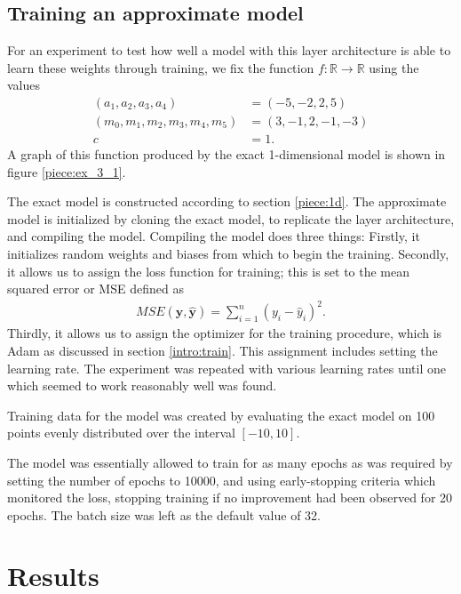 \documentclass{somasmsc}
\begin{document}
\subsection{Training an approximate model}\label{piece:train}

For an experiment to test how well a model with this layer architecture is able to learn these weights through training, we fix the function $f : \mathbb{R} \rightarrow \mathbb{R}$ using the values
\begin{align*}
    \left(a_1, a_2, a_3, a_4\right) &= \left(-5, -2, 2, 5\right) \\
    \left(m_0, m_1, m_2, m_3, m_4, m_5\right) &= \left(3, -1, 2, -1, -3\right) \\
    c &= 1.
\end{align*}
 A graph of this function produced by the exact 1-dimensional model is shown in figure \ref{piece:ex_3_1}.

 The exact model is constructed according to section \ref{piece:1d}. The approximate model is initialized by cloning the exact model, to replicate the layer architecture, and compiling the model. Compiling the model does three things: Firstly, it initializes random weights and biases from which to begin the training. Secondly, it allows us to assign the loss function for training; this is set to the mean squared error or MSE defined as
 \begin{align*}
     MSE\left(\pmb{y}, \hat{\pmb{y}}\right) = \sum_{i=1}^n \left(y_i - \hat{y}_i\right)^2.
 \end{align*}
 Thirdly, it allows us to assign the optimizer for the training procedure, which is Adam as discussed in section \ref{intro:train}. This assignment includes setting the learning rate. The experiment was repeated with various learning rates until one which seemed to work reasonably well was found.

 Training data for the model was created by evaluating the exact model on 100 points evenly distributed over the interval $\left[-10, 10\right]$.

 The model was essentially allowed to train for as many epochs as was required by setting the number of epochs to 10000, and using early-stopping criteria which monitored the loss, stopping training if no improvement had been observed for 20 epochs. The batch size was left as the default value of 32.

\section{Results}
\end{document}
